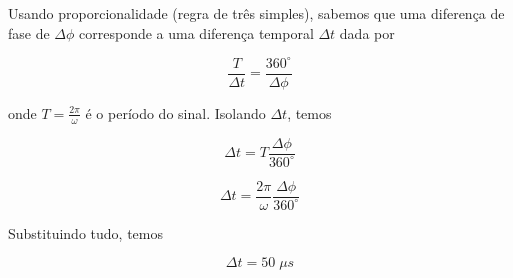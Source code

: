Usando proporcionalidade (regra de três simples), sabemos que uma 
diferença de fase de \(\Delta \phi \) corresponde a uma diferença 
temporal \(\Delta t \) dada por    


\[ \frac{T}{\Delta t} = \frac{360^{\circ}}{\Delta \phi}  \]

onde \(T = \frac{2\pi}{\omega} \) é o período do sinal. Isolando \(\Delta t \), temos

\begin{equation}\label{eq:9.14.3}\tag{9.14-3}
    \Delta t = T \frac{\Delta \phi}{360^{\circ}}
\end{equation}

\[  \Delta t = \frac{2\pi}{\omega} \frac{\Delta \phi}{360^{\circ}}  \]

Substituindo tudo, temos

\[ \boxed{\Delta t = 50 \; \mu s}  \]

% 